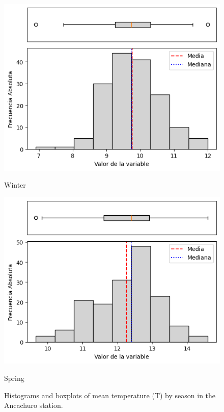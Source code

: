 \begin{figure}[htbp]
\vspace{0.2cm}

\begin{minipage}{0.30\textwidth}
  \includegraphics[width=\linewidth]{resultados/por_estacion_del_anio/boxplot_clases_por_estacion/Ancachuro/T_HistBoxplot_Winter.png}
  \caption*{Winter}
\end{minipage}
\hfill
\begin{minipage}{0.30\textwidth}
  \includegraphics[width=\linewidth]{resultados/por_estacion_del_anio/boxplot_clases_por_estacion/Ancachuro/T_HistBoxplot_Spring.png}
  \caption*{Spring}
\end{minipage}
\caption{Histograms and boxplots of mean temperature (T) by season in the Ancachuro station.}
\label{fig:ancachuro_t_hist}
\end{figure}

